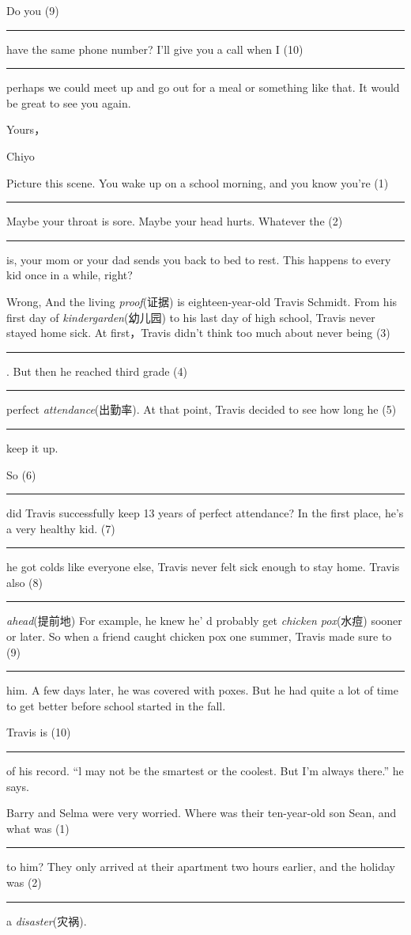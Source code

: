 \documentclass{article}
\newcommand{\kong}{\rule{4em}{0.5pt} }
\begin{document}
Do you (9)\kong have the same phone number? I'll give 
you a call when I (10)\kong  perhaps we could 
meet up and go out for a meal or something like that. It would be great to 
see you again.

\begin{flushright}
Yours，

Chiyo
\end{flushright}

\begin{center}
\end{center}

Picture this scene. You wake up on a school morning, and you know you're 
(1)\kong  Maybe your throat is sore. Maybe your head 
hurts. Whatever the (2)\kong is, your mom or your dad 
sends you back to bed to rest. This happens to every kid once in a while, 
right?

Wrong, And the living \textit{proof}\/(证据) is eighteen-year-old Travis Schmidt. From his 
first day of \textit{kindergarden}\/(幼儿园) to his last day of high school, Travis never stayed 
home sick. At first，Travis didn't think too much about never being 
(3)\kong . But then he reached third grade 
(4)\kong perfect \textit{attendance}\/(出勤率). At that point, 
Travis decided to see how long he (5)\kong keep it 
up.

So (6)\kong  did Travis successfully keep 13 years 
of perfect attendance? In the first place, he's a very healthy kid. 
(7)\kong  he got colds like everyone else, Travis 
never felt sick enough to stay home. Travis also 
(8)\kong  \textit{ahead}\/(提前地) For example, he knew he' d 
probably get \textit{chicken pox}\/(水痘) sooner or later. So when a friend caught chicken pox one 
summer, Travis made sure to (9)\kong him. A few days 
later, he was covered with poxes. But he had quite a lot of time to get 
better before school started in the fall.

Travis is (10)\kong  of his record. ``l may not be the 
smartest or the coolest. But I'm always there.'' he says.

\begin{center}
\end{center}

Barry and Selma were very worried. Where was their ten-year-old son Sean, 
and what was (1)\kong  to him? They only 
arrived at their apartment two hours earlier, and the holiday was 
(2)\kong a \textit{disaster}\/(灾祸).
\end{document}
